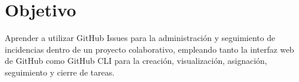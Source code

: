 \section{Objetivo}

Aprender a utilizar GitHub Issues para la administración y seguimiento de incidencias dentro de un proyecto colaborativo, empleando tanto la interfaz web de GitHub como GitHub CLI para la creación, visualización, asignación, seguimiento y cierre de tareas.
